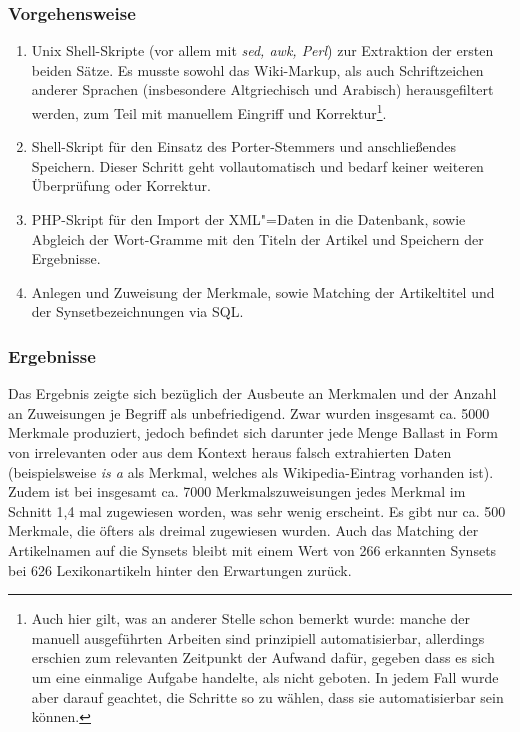 \documentclass[pagesize,paper=A4,DIV=calc,fontsize=12pt,draft=false]{scrreprt}
\begin{document}
\subsubsection{Vorgehensweise}

\begin{enumerate}
\item Unix Shell-Skripte (vor allem mit \emph{sed, awk, Perl}) zur Extraktion der ersten beiden Sätze. 
Es musste sowohl das Wiki-Markup, als auch Schriftzeichen anderer Sprachen (insbesondere Altgriechisch und Arabisch) herausgefiltert werden, zum Teil mit manuellem Eingriff und Korrektur\footnote{Auch hier gilt, was an anderer Stelle schon bemerkt wurde: manche der manuell ausgeführten Arbeiten sind prinzipiell automatisierbar, allerdings erschien zum relevanten Zeitpunkt der Aufwand dafür, gegeben dass es sich um eine einmalige Aufgabe handelte, als nicht geboten. 
In jedem Fall wurde aber darauf geachtet, die Schritte so zu wählen, dass sie automatisierbar sein können.}.
\item Shell-Skript für den Einsatz des Porter-Stemmers und anschließendes Speichern. 
Dieser Schritt geht vollautomatisch und bedarf keiner weiteren Überprüfung oder Korrektur.
\item PHP-Skript für den Import der XML"=Daten in die Datenbank, sowie Abgleich der Wort-Gramme mit den Titeln der Artikel und Speichern der Ergebnisse.
\item Anlegen und Zuweisung der Merkmale, sowie Matching der Artikeltitel und der Synsetbezeichnungen via SQL. 
\end{enumerate}

\subsubsection{Ergebnisse}

Das Ergebnis zeigte sich bezüglich der Ausbeute an Merkmalen und der Anzahl an Zuweisungen je Begriff als unbefriedigend. 
Zwar wurden insgesamt ca. 5000 Merkmale produziert, jedoch befindet sich darunter jede Menge Ballast in Form von irrelevanten oder aus dem Kontext heraus falsch extrahierten Daten (beispielsweise \emph{is a} als Merkmal, welches als Wikipedia-Eintrag vorhanden ist). 
Zudem ist bei insgesamt ca. 7000 Merkmalszuweisungen jedes Merkmal im Schnitt 1,4 mal zugewiesen worden, was sehr wenig erscheint. 
Es gibt nur ca. 500 Merkmale, die öfters als dreimal zugewiesen wurden. 
Auch das Matching der Artikelnamen auf die Synsets bleibt mit einem Wert von 266 erkannten Synsets bei 626 Lexikonartikeln hinter den Erwartungen zurück. 
\end{document}
